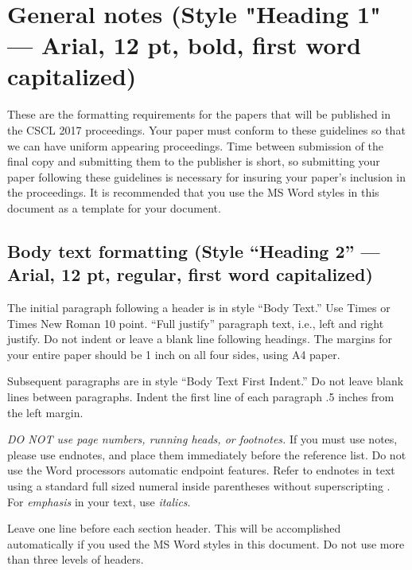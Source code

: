 \documentclass{article}
\title{     }
\author{     }
\date{     }
\begin{document}
\section{General notes (Style "Heading 1" --- Arial, 12 pt, bold, first word capitalized)}
These are the formatting requirements for the papers that will be published in the CSCL 2017 proceedings. Your
paper must conform to these guidelines so that we can have uniform appearing proceedings. Time between
submission of the final copy and submitting them to the publisher is short, so submitting your paper following
these guidelines is necessary for insuring your paper’s inclusion in the proceedings. It is recommended that you
use the MS Word styles in this document as a template for your document.
\subsection{Body text formatting (Style “Heading 2” --- Arial, 12 pt, regular, first word capitalized)}
The initial paragraph following a header is in style “Body Text.” Use Times or Times New Roman 10 point.
“Full justify” paragraph text, i.e., left and right justify. Do not indent or leave a blank line following headings.
The margins for your entire paper should be 1 inch on all four sides, using A4 paper.

Subsequent paragraphs are in style “Body Text First Indent.” Do not leave blank lines between
paragraphs. Indent the first line of each paragraph .5 inches from the left margin.

\emph{DO NOT use page numbers, running heads, or footnotes.} If you must use notes, please use endnotes,
and place them immediately before the reference list. Do not use the Word processors automatic endpoint
features. Refer to endnotes in text using a standard full sized numeral inside parentheses  without superscripting . For \emph{emphasis} in your text, use \emph{italics}.

Leave one line before each section header. This will be accomplished automatically if you used the MS
Word styles in this document. Do not use more than three levels of headers.
\end{document}
